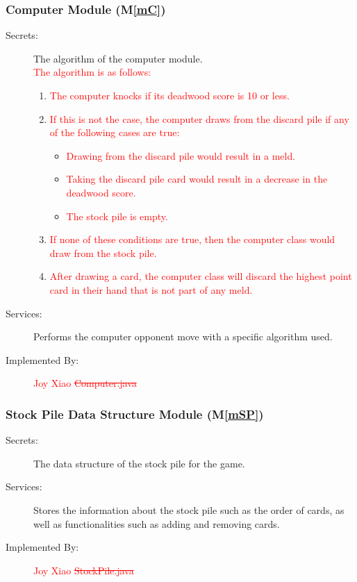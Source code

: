 \documentclass[12pt, titlepage]{article}
\newcommand{\mref}[1]{M\ref{#1}}
\begin{document}
\subsubsection{Computer Module (\mref{mC})}
\begin{description}
    \item[Secrets:]The algorithm of the computer module. \\
    
    \noindent \textcolor{red}{The algorithm is as follows:}
    
    \begin{enumerate}
        \item \textcolor{red}{The computer knocks if its deadwood score is 10 or less.}
        \item \textcolor{red}{If this is not the case, the computer draws from the discard pile if any of the following cases are true:}
        \begin{itemize}
            \item \textcolor{red}{Drawing from the discard pile would result in a meld.}
            \item \textcolor{red}{Taking the discard pile card would result in a decrease in the deadwood score.}
            \item \textcolor{red}{The stock pile is empty.}
        \end{itemize}
        \item \textcolor{red}{If none of these conditions are true, then the computer class would draw from the stock pile.}
        \item \textcolor{red}{After drawing a card, the computer class will discard the highest point card in their hand that is not part of any meld.}
    \end{enumerate}
    
    \item[Services:]Performs the computer opponent move with a specific algorithm used.
    \item[Implemented By:] \textcolor{red}{Joy Xiao} \textcolor{red}{\sout{Computer.java}}
\end{description}

\subsubsection{Stock Pile Data Structure Module (\mref{mSP})}
\begin{description}
    \item[Secrets:]The data structure of the stock pile for the game.
    \item[Services:]Stores the information about the stock pile such as the order of cards, as well as functionalities such as adding and removing cards. 
    \item[Implemented By:] \textcolor{red}{Joy Xiao} \textcolor{red}{\sout{StockPile.java}}
\end{description}
\end{document}
